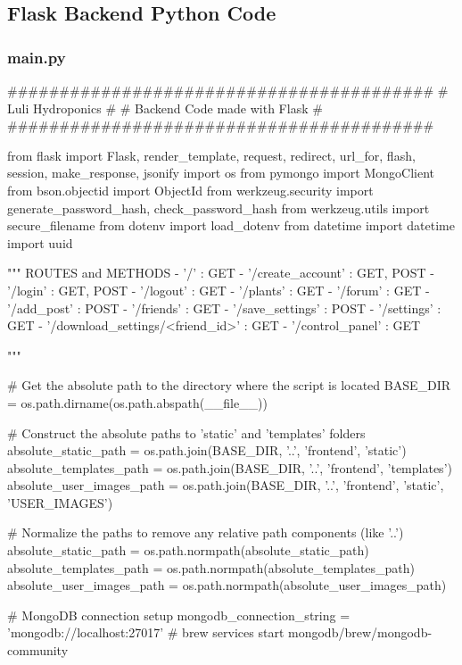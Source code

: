 \documentclass[12pt]{article} %
\begin{document}
\subsection{Flask Backend Python Code}
\subsubsection{main.py}
\begin{pythoncode}[caption={Main Flask Backend Code}]
    #########################################
    #           Luli Hydroponics            #
    #      Backend Code made with Flask    #
    #########################################
    
    
    from flask import Flask, render_template, request, redirect, url_for, flash, session, make_response, jsonify
    import os
    from pymongo import MongoClient
    from bson.objectid import ObjectId
    from werkzeug.security import generate_password_hash, check_password_hash
    from werkzeug.utils import secure_filename
    from dotenv import load_dotenv
    from datetime import datetime
    import uuid
    
    """
    ROUTES and METHODS
    - '/' : GET
    - '/create_account' : GET, POST
    - '/login' : GET, POST
    - '/logout' : GET
    - '/plants' : GET
    - '/forum' : GET
    - '/add_post' : POST
    - '/friends' : GET
    - '/save_settings' : POST
    - '/settings' : GET
    - '/download_settings/<friend_id>' : GET
    - '/control_panel' : GET
    
    """
    
    
    # Get the absolute path to the directory where the script is located
    BASE_DIR = os.path.dirname(os.path.abspath(__file__))
    
    
    # Construct the absolute paths to 'static' and 'templates' folders
    absolute_static_path = os.path.join(BASE_DIR, '..', 'frontend', 'static')
    absolute_templates_path = os.path.join(BASE_DIR, '..', 'frontend', 'templates')
    absolute_user_images_path = os.path.join(BASE_DIR, '..', 'frontend', 'static', 'USER_IMAGES')
    
    # Normalize the paths to remove any relative path components (like '..')
    absolute_static_path = os.path.normpath(absolute_static_path)
    absolute_templates_path = os.path.normpath(absolute_templates_path)
    absolute_user_images_path = os.path.normpath(absolute_user_images_path)
    
    
    # MongoDB connection setup
    mongodb_connection_string = 'mongodb://localhost:27017'
    # brew services start mongodb/brew/mongodb-community
    

\end{pythoncode}
\end{document}
